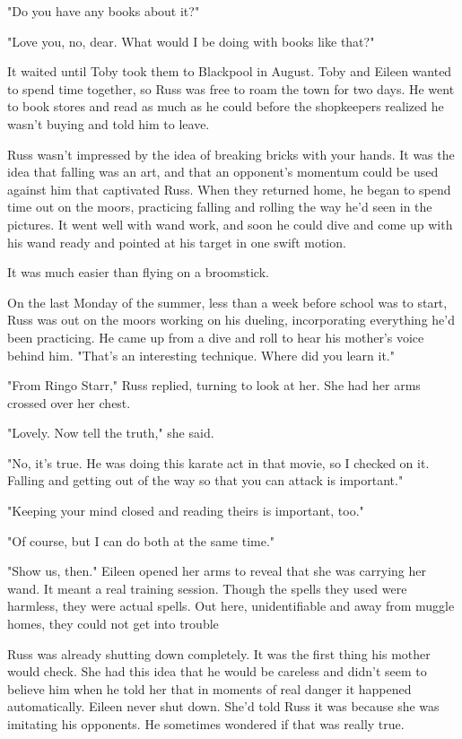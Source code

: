 "Do you have any books about it?"

"Love you, no, dear. What would I be doing with books like that?"

It waited until Toby took them to Blackpool in August. Toby and Eileen wanted to spend time together, so Russ was free to roam the town for two days. He went to book stores and read as much as he could before the shopkeepers realized he wasn't buying and told him to leave.

Russ wasn't impressed by the idea of breaking bricks with your hands. It was the idea that falling was an art, and that an opponent's momentum could be used against him that captivated Russ. When they returned home, he began to spend time out on the moors, practicing falling and rolling the way he'd seen in the pictures. It went well with wand work, and soon he could dive and come up with his wand ready and pointed at his target in one swift motion.

It was much easier than flying on a broomstick.

On the last Monday of the summer, less than a week before school was to start, Russ was out on the moors working on his dueling, incorporating everything he'd been practicing. He came up from a dive and roll to hear his mother's voice behind him. "That's an interesting technique. Where did you learn it."

"From Ringo Starr," Russ replied, turning to look at her. She had her arms crossed over her chest.

"Lovely. Now tell the truth," she said.

"No, it's true. He was doing this karate act in that movie, so I checked on it. Falling and getting out of the way so that you can attack is important."

"Keeping your mind closed and reading theirs is important, too."

"Of course, but I can do both at the same time."

"Show us, then." Eileen opened her arms to reveal that she was carrying her wand. It meant a real training session. Though the spells they used were harmless, they were actual spells. Out here, unidentifiable and away from muggle homes, they could not get into trouble

Russ was already shutting down completely. It was the first thing his mother would check. She had this idea that he would be careless and didn't seem to believe him when he told her that in moments of real danger it happened automatically. Eileen never shut down. She'd told Russ it was because she was imitating his opponents. He sometimes wondered if that was really true.

